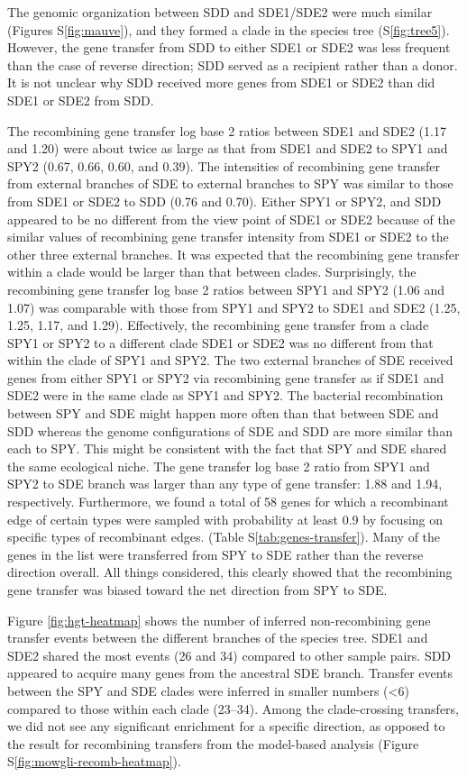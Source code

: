\documentclass[english]{article}
\begin{document}
The genomic organization between SDD and SDE1/SDE2 were much similar (Figures
S\ref{fig:mauve}), and they formed a clade in the species tree
(S\ref{fig:tree5}). However, the gene transfer from SDD to either SDE1 or SDE2
was less frequent than the case of reverse direction; SDD served as a recipient
rather than a donor. It is not unclear why SDD received more genes from SDE1 or
SDE2 than did SDE1 or SDE2 from SDD. 

The recombining gene transfer log base 2 ratios between SDE1 and SDE2 (1.17 and
1.20) were about twice as large as that from SDE1 and SDE2 to SPY1 and SPY2
(0.67, 0.66, 0.60, and 0.39).  The intensities of recombining gene transfer from
external branches of SDE to external branches to SPY was similar to those from
SDE1 or SDE2 to SDD (0.76 and 0.70).  Either SPY1 or SPY2, and SDD appeared to
be no different from the view point of SDE1 or SDE2 because of the similar
values of recombining gene transfer intensity from SDE1 or SDE2 to the other
three external branches.  It was expected that the recombining gene transfer
within a clade would be larger than that between clades.  Surprisingly, the
recombining gene transfer log base 2 ratios between SPY1 and SPY2 (1.06 and
1.07) was comparable with those from SPY1 and SPY2 to SDE1 and SDE2 (1.25, 1.25,
1.17, and 1.29).  Effectively, the recombining gene transfer from a clade SPY1
or SPY2 to a different clade SDE1 or SDE2 was no different from that within the
clade of SPY1 and SPY2. The two external branches of SDE received genes from
either SPY1 or SPY2 via recombining gene transfer as if SDE1 and SDE2 were in
the same clade as SPY1 and SPY2.  The bacterial recombination between SPY and
SDE might happen more often than that between SDE and SDD whereas the genome
configurations of SDE and SDD are more similar than each to SPY. This might be
consistent with the fact that SPY and SDE shared the same ecological niche.  The
gene transfer log base 2 ratio from SPY1 and SPY2 to SDE branch was larger than
any type of gene transfer: 1.88 and 1.94, respectively.  Furthermore, we found a
total of 58 genes for which a recombinant edge of certain types were sampled
with probability at least 0.9 by focusing on specific types of recombinant
edges.  (Table S\ref{tab:genes-transfer}).  Many of the genes in the list were
transferred from SPY to SDE rather than the reverse direction overall.  All
things considered, this clearly showed that the recombining gene transfer was
biased toward the net direction from SPY to SDE.

Figure \ref{fig:hgt-heatmap} shows the number of inferred non-recombining gene
transfer events between the different branches of the species tree.  SDE1 and
SDE2 shared the most events (26 and 34) compared to other sample pairs.  SDD
appeared to acquire many genes from the ancestral SDE branch. Transfer events
between the SPY and SDE clades were inferred in smaller numbers (<6) compared to
those within each clade (23--34). Among the clade-crossing transfers, we did not
see any significant enrichment for a specific direction, as opposed to the
result for recombining transfers from the model-based analysis (Figure
S\ref{fig:mowgli-recomb-heatmap}).
\end{document}
